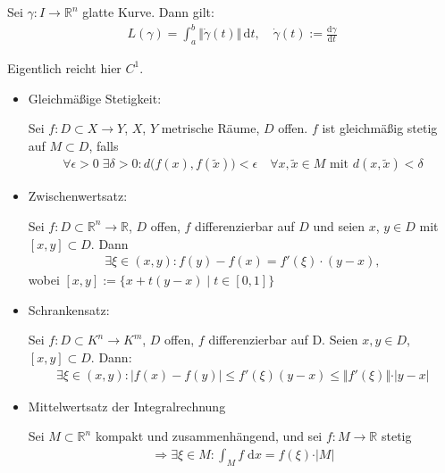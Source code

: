 \begin{proposition}
	Sei $\gamma:I\to\mathbb{R}^n$ glatte Kurve. Dann gilt: \begin{align}
		L(\gamma) = \int_a^b \Vert \dot{\gamma}(t)\Vert\, \mathrm{d}t, \quad \dot{\gamma}(t) := \frac{\mathrm{d}\gamma}{\mathrm{d}t}
	\end{align}
\end{proposition}

\begin{underlinedenvironment}[Bemerkung]
	Eigentlich reicht hier $C^1$.
\end{underlinedenvironment}

\begin{repetition}
	\begin{itemize}
		\item Gleichmäßige Stetigkeit:
		
		Sei $f\!:D\subset X\to Y$, $X$, $Y$ metrische Räume, $D$ offen. $f$ ist gleichmäßig stetig auf $M\subset D$, falls \begin{align*}
			\forall \epsilon > 0\;\exists \delta > 0: d\big( f(x), f(\tilde{x})\big) < \epsilon \quad\forall x, \tilde{x}\in M \text{ mit } d(x,\tilde{x}) < \delta
		\end{align*}
		\item Zwischenwertsatz:
		
		Sei $f\!:D\subset\mathbb{R}^n\to \mathbb{R}$, $D$ offen, $f$ differenzierbar auf $D$ und seien $x$, $y\in D$ mit $[x,y]\subset D$. Dann \begin{align*}
			\exists \xi \in (x,y): f(y) - f(x) = f'(\xi) \cdot (y - x),
		\end{align*}
		wobei $[x,y] := \{ x + t(y - x) \mid t\in [0,1]\}$
		\item Schrankensatz:
		
		Sei $f\!:D\subset K^n\to K^m$, $D$ offen, $f$ differenzierbar auf D. Seien $x,y\in D$, $[x,y]\subset D$. Dann: \begin{align*}
			\exists \xi \in (x,y): \vert f(x) - f(y) \vert \le f'(\xi) (y - x) \le \Vert f'(\xi) \Vert \cdot \vert y - x\vert
		\end{align*}
		
		\item Mittelwertsatz der Integralrechnung
		
		Sei $M\subset\mathbb{R}^n$ kompakt und zusammenhängend, und sei $f\!:M\to\mathbb{R}$ stetig \begin{align*}
			\Rightarrow \exists \xi\in M: \int_M f\;\mathrm{d}x = f(\xi) \cdot \vert M \vert
		\end{align*}
	\end{itemize}
\end{repetition}

